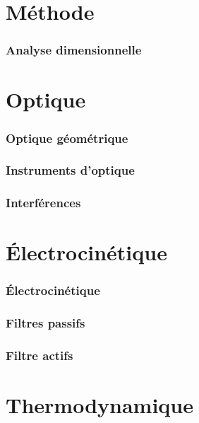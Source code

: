 



\frontmatter
\tableofcontents
\mainmatter
\setcounter{page}{1}

\part{Méthode}
\section{Analyse dimensionnelle}

\part{Optique}
\section{Optique géométrique}
\section{Instruments d'optique}
\section{Interférences}

\part{Électrocinétique}
\section{Électrocinétique}
\section{Filtres passifs}
\section{Filtre actifs}

\part{Thermodynamique}

